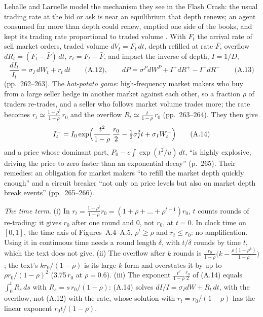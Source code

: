 \begin{qfmodel}\label{mod:depth-overflow-flash-crash}
 Lehalle and Laruelle model the mechanism they see in the Flash Crash: the usual trading rate at the bid or ask is near an equilibrium that depth renews; an agent consumed far more than depth could renew, emptied one side of the books, and kept its trading rate proportional to traded volume \citep[app.~A, sec.~A.5, pp.~261--262]{alpha-laruelle}. With $F_t$ the arrival rate of sell market orders, traded volume $dV_t=F_t\,dt$, depth refilled at rate $\bar F$, overflow $dR_t=(F_t-\bar F)\,dt$, $r_t=F_t-\bar F$, and impact the inverse of depth, $I=1/D$,
\[ \frac{dI_t}{I_t}=\sigma_I\,dW_t+r_t\,dt \qquad\text{(A.12)},\qquad dP=\sigma^P dW^P+I^+dR^+-I^-dR^- \qquad\text{(A.13)} \]
(pp.~262--263). The \emph{hot-potato game}: high-frequency market makers who buy from a large seller hedge in another market against each other, so a fraction $\rho$ of traders re-trades, and a seller who follows market volume trades more; the rate becomes $r_t\simeq\frac{1-\rho^t}{1-\rho}\,r_0$ and the overflow $R_t\simeq\frac{t}{1-\rho}\,r_0$ (pp.~263--264). They then give
\[ I^-_t=I_0\exp\Bigl(\frac{t^2}{1-\rho}\,\frac{r_0}{2}-\tfrac12\sigma_I^2t+\sigma_IW^-_t\Bigr)\qquad\text{(A.14)} \]
and a price whose dominant part, $P_0-c\int\exp(t^2/u)\,dt$, ``is highly explosive, driving the price to zero faster than an exponential decay'' (p.~265). Their remedies: an obligation for market makers ``to refill the market depth quickly enough'' and a circuit breaker ``not only on price levels but also on market depth break events'' (pp.~265--266).

 \emph{The time term}. (i) In $r_t=\frac{1-\rho^t}{1-\rho}r_0=(1+\rho+\dots+\rho^{t-1})r_0$, $t$ counts rounds of re-trading: it gives $r_0$ after one round and 0, not $r_0$, at $t=0$. In clock time on $[0,1]$, the time axis of Figures~A.4--A.5, $\rho^t\ge\rho$ and $r_t\le r_0$: no amplification. Using it in continuous time needs a round length $\delta$, with $t/\delta$ rounds by time $t$, which the text does not give. (ii) The overflow after $k$ rounds is $\frac{r_0}{1-\rho}\bigl(k-\frac{\rho(1-\rho^k)}{1-\rho}\bigr)$; the text's $kr_0/(1-\rho)$ is its large-$k$ form and overstates it by up to $\rho r_0/(1-\rho)^2$ (3.75$\,r_0$ at $\rho=0.6$). (iii) The exponent $\frac{t^2}{1-\rho}\frac{r_0}{2}$ of (A.14) equals $\int_0^tR_s\,ds$ with $R_s=s\,r_0/(1-\rho)$: (A.14) solves $dI/I=\sigma_IdW+R_t\,dt$, with the overflow, not (A.12) with the rate, whose solution with $r_t=r_0/(1-\rho)$ has the linear exponent $r_0t/(1-\rho)$.


\end{qfmodel}
